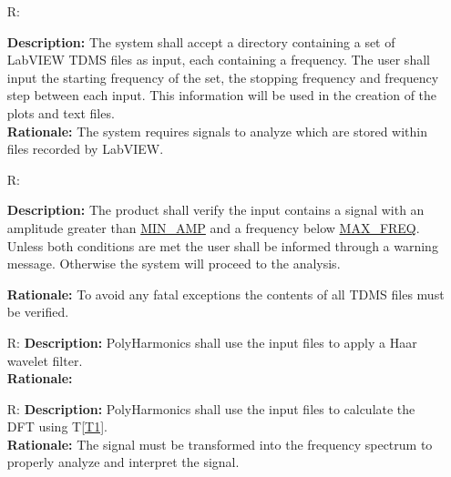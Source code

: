 \documentclass[12pt]{article}
\newcounter{reqnum} %
\newcommand{\progname}{PolyHarmonics}
\begin{document}
\noindent \begin{itemize}

\item[R\refstepcounter{reqnum}\thereqnum \label{R_Input}:] 

\textbf{Description:} The system shall accept a directory containing a set of 
LabVIEW TDMS files as
input, each containing a frequency. The user shall input the starting
 frequency of the set, the stopping frequency and frequency step between each 
 input. This information will be used in the creation of the plots and 
 text files.\\
\textbf{Rationale:} The system requires signals to analyze which are stored
within files recorded by LabVIEW.\\


\item[R\refstepcounter{reqnum}\thereqnum \label{R_Verify}:] 

\textbf{Description:} The product shall verify the input contains a signal
 with an amplitude greater than \hyperref[AppendA]{MIN\_AMP} and a frequency
  below \hyperref[AppendA]{MAX\_FREQ}. Unless both conditions are met 
  the user shall be informed through a warning message. Otherwise the system will 
proceed to the analysis.

\textbf{Rationale:} To avoid any fatal exceptions the contents of all TDMS 
files must be verified.


\item[R\refstepcounter{reqnum}\thereqnum \label{R_Filter}:] 
\textbf{Description:} \progname{} shall use the input files to apply a Haar 
wavelet filter. \cite{WaveletIntro} \cite{WaveletGuide}\\ 
\textbf{Rationale:} 

\item[R\refstepcounter{reqnum}\thereqnum \label{R_Tranform}:] 
\textbf{Description:} \progname{} shall use the input files to calculate the DFT
using T\ref{T1}.\\
\textbf{Rationale:} The signal must be transformed into the frequency spectrum
to properly analyze and interpret the signal.\newline


\end{itemize}
\end{document}
